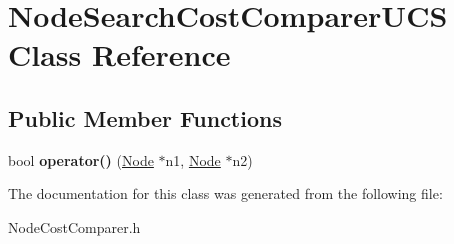 \hypertarget{class_node_search_cost_comparer_u_c_s}{}\section{Node\+Search\+Cost\+Comparer\+U\+CS Class Reference}
\label{class_node_search_cost_comparer_u_c_s}
\subsection*{Public Member Functions}
\begin{DoxyCompactItemize}
\item 
\mbox{\label{class_node_search_cost_comparer_u_c_s_a8f7c857e5ba2f4b447881394214fce7f}} 
bool {\bfseries operator()} (\mbox{\hyperlink{class_node}{Node}} $\ast$n1, \mbox{\hyperlink{class_node}{Node}} $\ast$n2)
\end{DoxyCompactItemize}


The documentation for this class was generated from the following file\+:\begin{DoxyCompactItemize}
\item 
Node\+Cost\+Comparer.\+h\end{DoxyCompactItemize}
